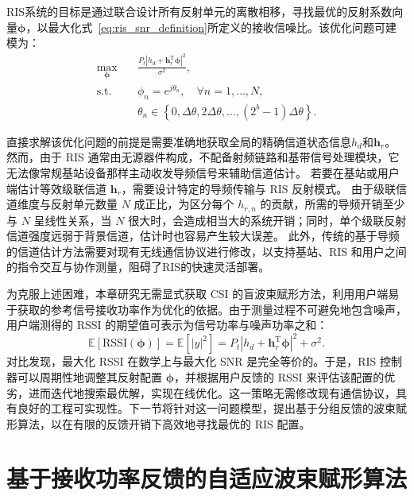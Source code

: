 RIS系统的目标是通过联合设计所有反射单元的离散相移，寻找最优的反射系数向量$\bm{\phi}$，以最大化式~\eqref{eq:ris_snr_definition}所定义的接收信噪比。该优化问题可建模为：
\begin{equation}\label{eq:ris_optimization_problem}
	\begin{aligned}
		\max_{\bm{\phi}} \quad & \frac{P_t |h_d + \bm{h}_r^\mathrm{T} \bm{\phi}|^2}{\sigma^2}, \\
		\text{s.t.} \quad & \phi_n = e^{j\theta_n}, \quad \forall n = 1, \dots, N, \\
		& \theta_n \in \left\{ 0, \Delta\theta, 2\Delta\theta, \dots, (2^b - 1)\Delta\theta \right\}.
	\end{aligned}
\end{equation}

直接求解该优化问题的前提是需要准确地获取全局的精确信道状态信息$h_d$和$\bm{h}_r$。然而，由于 RIS 通常由无源器件构成，不配备射频链路和基带信号处理模块，它无法像常规基站设备那样主动收发导频信号来辅助信道估计。
若要在基站或用户端估计等效级联信道 $\bm{h}_r$，需要设计特定的导频传输与 RIS 反射模式。
由于级联信道维度与反射单元数量 $N$ 成正比，为区分每个 $h_{r,n}$ 的贡献，所需的导频开销至少与 $N$ 呈线性关系，当 $N$ 很大时，会造成相当大的系统开销；同时，单个级联反射信道强度远弱于背景信道，估计时也容易产生较大误差。
此外，传统的基于导频的信道估计方法需要对现有无线通信协议进行修改，以支持基站、RIS 和用户之间的指令交互与协作测量，阻碍了RIS的快速灵活部署。

为克服上述困难，本章研究无需显式获取 CSI 的盲波束赋形方法，利用用户端易于获取的参考信号接收功率作为优化的依据。由于测量过程不可避免地包含噪声，用户端测得的 RSSI 的期望值可表示为信号功率与噪声功率之和：
\begin{equation}\label{eq:ris_rssi_definition}
	\mathbb{E}\left[\text{RSSI}(\bm{\phi})\right] = \mathbb{E}\left[|y|^2\right] = P_t \left| h_d + \bm{h}_r^\mathrm{T} \bm{\phi} \right|^2 + \sigma^2.
\end{equation}
对比发现，最大化 RSSI 在数学上与最大化 SNR 是完全等价的。于是，RIS 控制器可以周期性地调整其反射配置 $\bm{\phi}$，并根据用户反馈的 RSSI 来评估该配置的优劣，进而迭代地搜索最优解，实现在线优化。这一策略无需修改现有通信协议，具有良好的工程可实现性。下一节将针对这一问题模型，提出基于分组反馈的波束赋形算法，以在有限的反馈开销下高效地寻找最优的 RIS 配置。


\section{基于接收功率反馈的自适应波束赋形算法}\label{sec:ris_algorithms}


